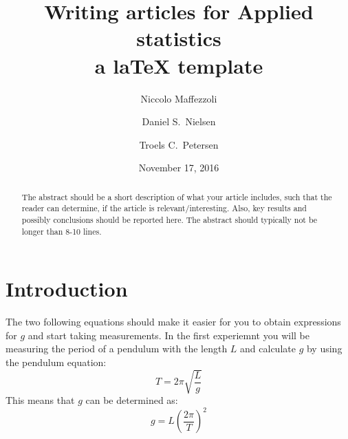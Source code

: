 \documentclass[a4paper,%
               aps,%
               prl,%
               amsfonts,%
               amssymb,%
               amsmath,%
               nobibnotes,%
               twocolumn, %
               twoside,%
               balancelastpage,%
               eqsecnum] %
               {revtex4-1}
\begin{document}

\title{Writing articles for Applied statistics \\ a laTeX template} %
\date{November 17, 2016}                                                %

\author{Niccolo Maffezzoli}
\author{Daniel S.\ Nielsen}
\author{Troels C.\ Petersen}

\begin{abstract}                                              
The abstract should be a short description of what your article includes, such that the reader can
determine, if the article is relevant/interesting. Also, key results and possibly conclusions should
be reported here. The abstract should typically not be longer than 8-10 lines.
\end{abstract}

\maketitle 

\setcounter{section}{1} %
\setcounter{equation}{0} %



\section{Introduction}
The two following equations should make it easier for you to obtain expressions for $g$ and start taking measurements.
In the first experiemnt you will be measuring the period of a pendulum with the length $L$ and calculate $g$ by using the pendulum equation:
\begin{equation}
T = 2\pi\sqrt{\frac{L}{g}} \label{eq:Pendul}
\end{equation}
This means that $g$ can be determined as:
\begin{equation}
g = L \left( \frac{2\pi}{T} \right)^2 \label{eq:Pendul}
\end{equation}
\end{document}
